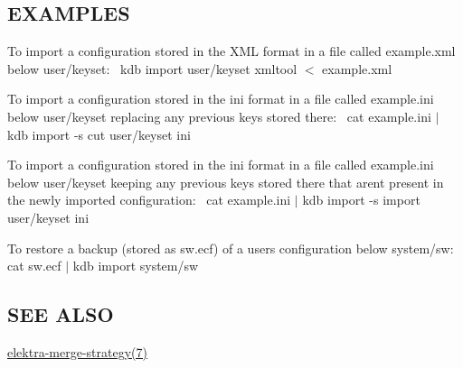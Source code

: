 \subsection*{E\+X\+A\+M\+P\+L\+ES}

To import a configuration stored in the X\+ML format in a file called {\ttfamily example.\+xml} below {\ttfamily user/keyset}\+:~\newline
 {\ttfamily kdb import user/keyset xmltool $<$ example.\+xml}

To import a configuration stored in the {\ttfamily ini} format in a file called {\ttfamily example.\+ini} below {\ttfamily user/keyset} replacing any previous keys stored there\+:~\newline
 {\ttfamily cat example.\+ini $\vert$ kdb import -\/s cut user/keyset ini}

To import a configuration stored in the {\ttfamily ini} format in a file called {\ttfamily example.\+ini} below {\ttfamily user/keyset} keeping any previous keys stored there that aren\textquotesingle{}t present in the newly imported configuration\+:~\newline
 {\ttfamily cat example.\+ini $\vert$ kdb import -\/s import user/keyset ini}

To restore a backup (stored as {\ttfamily sw.\+ecf}) of a user\textquotesingle{}s configuration below {\ttfamily system/sw}\+:~\newline
 {\ttfamily cat sw.\+ecf $\vert$ kdb import system/sw}

\subsection*{S\+EE A\+L\+SO}


\begin{DoxyItemize}
\item \hyperlink{doc_help_elektra-merge-strategy_md}{elektra-\/merge-\/strategy(7)} 
\end{DoxyItemize}